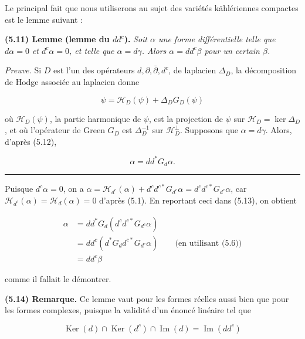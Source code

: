 \documentclass[
  french,
  a3paper,
  a3paper]{extarticle}
\begin{document}
Le principal fait que nous utiliserons au sujet des variétés
kählériennes compactes est le lemme suivant :

\textbf{(5.11) Lemme (lemme du \(dd^c\)).} \emph{Soit \(\alpha\) une
forme différentielle telle que \(d\alpha=0\) et \(d^c\alpha=0\), et
telle que \(\alpha=d\gamma\). Alors \(\alpha=dd^c\beta\) pour un certain
\(\beta\).}

\emph{Preuve.} Si \(D\) est l'un des opérateurs
\(d,\partial,\bar\partial,d^c\), de laplacien \(\Delta_D\), la
décomposition de Hodge associée au laplacien donne

\[\tag{5.12}\psi=\mathcal H_D(\psi)+\Delta_DG_D(\psi)\]

où \(\mathcal H_D(\psi)\), la partie harmonique de \(\psi\), est la
projection de \(\psi\) sur \(\mathcal H_D=\ker\Delta_D\), et où
l'opérateur de Green \(G_D\) est \(\Delta_D^{-1}\) sur
\(\mathcal H_D^\perp\). Supposons que \(\alpha=d\gamma\). Alors, d'après
(5.12),

\[\tag{5.13}\alpha=dd^*G_d\alpha.\]

\clearpage



\par

\vspace{0.7mm}\hrule\vspace{1.6mm}

\fontsize{9}{11}\selectfont

Puisque \(d^c\alpha=0\), on a
\(\alpha=\mathcal H_{d^c}(\alpha)+d^cd^{c*}G_{d^c}\alpha=d^cd^{c*}G_{d^c}\alpha\),
car \(\mathcal H_{d^c}(\alpha)=\mathcal H_d(\alpha)=0\) d'après (5.1).
En reportant ceci dans (5.13), on obtient

\[\begin{aligned}\alpha&=dd^*G_d(d^cd^{c*}G_{d^c}\alpha)\\&=dd^c(d^*G_dd^{c*}G_{d^c}\alpha)\qquad\text{(en utilisant (5.6))}\\&=dd^c\beta\end{aligned}\]

comme il fallait le démontrer.

\textbf{(5.14) Remarque.} Ce lemme vaut pour les formes réelles aussi
bien que pour les formes complexes, puisque la validité d'un énoncé
linéaire tel que

\[\operatorname{Ker}(d)\cap\operatorname{Ker}(d^c)\cap\operatorname{Im}(d)=\operatorname{Im}(dd^c)\]
\end{document}
